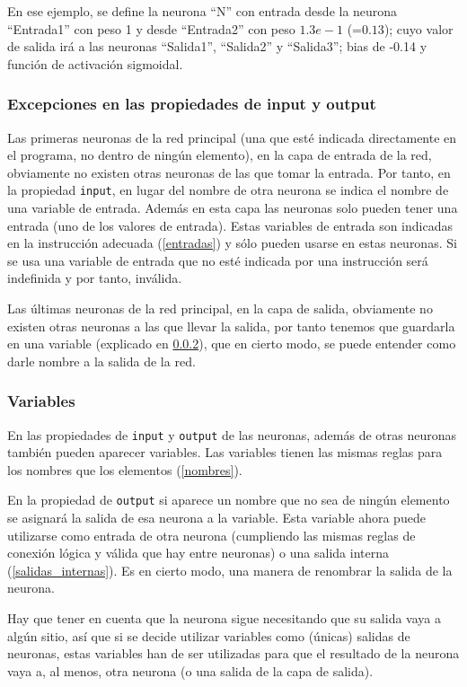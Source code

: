 \documentclass[a4paper]{article}
\begin{document}
En ese ejemplo, se define la neurona ``N'' con entrada desde la neurona ``Entrada1'' con peso 1 y desde ``Entrada2'' con peso $1.3e-1$ (=$0.13$); cuyo valor de salida irá a las neuronas ``Salida1'', ``Salida2'' y ``Salida3''; bias de -0.14 y función de activación sigmoidal.

\subsubsection{Excepciones en las propiedades de input y output}
Las primeras neuronas de la red principal (una que esté indicada directamente en el programa, no dentro de ningún elemento), en la capa de entrada de la red, obviamente no existen otras neuronas de las que tomar la entrada. Por tanto, en la propiedad \texttt{input}, en lugar del nombre de otra neurona se indica el nombre de una variable de entrada. Además en esta capa las neuronas solo pueden tener una entrada (uno de los valores de entrada). Estas variables de entrada son indicadas en la instrucción adecuada (\ref{entradas}) y sólo pueden usarse en estas neuronas. Si se usa una variable de entrada que no esté indicada por una instrucción será indefinida y por tanto, inválida.

Las últimas neuronas de la red principal, en la capa de salida, obviamente no existen otras neuronas a las que llevar la salida, por tanto tenemos que guardarla en una variable (explicado en \ref{variables}), que en cierto modo, se puede entender como darle nombre a la salida de la red.

\subsubsection{Variables}\label{variables}
En las propiedades de \texttt{input} y \texttt{output} de las neuronas, además de otras neuronas también pueden aparecer variables. Las variables tienen las mismas reglas para los nombres que los elementos (\ref{nombres}).

En la propiedad de \texttt{output} si aparece un nombre que no sea de ningún elemento se asignará la salida de esa neurona a la variable. Esta variable ahora puede utilizarse como entrada de otra neurona (cumpliendo las mismas reglas de conexión lógica y válida que hay entre neuronas) o una salida interna (\ref{salidas_internas}). Es en cierto modo, una manera de renombrar la salida de la neurona.

Hay que tener en cuenta que la neurona sigue necesitando que su salida vaya a algún sitio, así que si se decide utilizar variables como (únicas) salidas de neuronas, estas variables han de ser utilizadas para que el resultado de la neurona vaya a, al menos, otra neurona (o una salida de la capa de salida).
\end{document}
